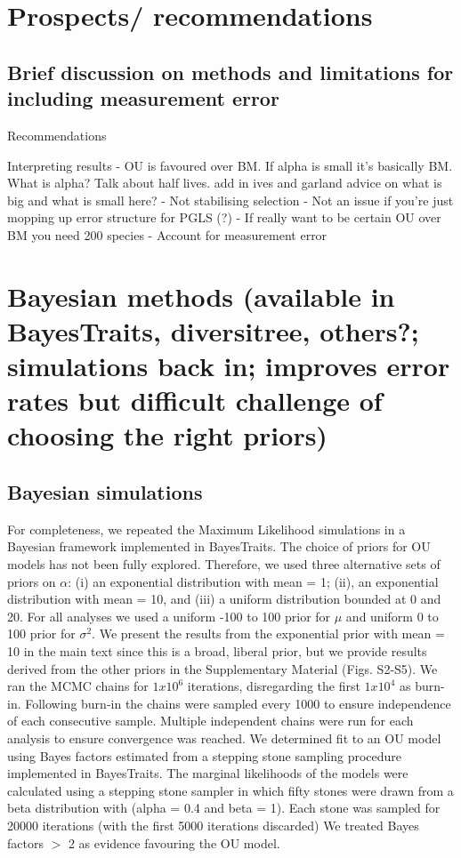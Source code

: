\documentclass[a4paper,12pt]{article}
\begin{document}
\section{Prospects/ recommendations}
  \subsection{Brief discussion on methods and limitations for including measurement error}

  Recommendations

Interpreting results
 - OU is favoured over BM. If alpha is small it's basically BM. What
is alpha? Talk about half lives. add in ives and garland advice on what is big and what is small here?
 - Not stabilising selection
 - Not an issue if you're just mopping up error structure for PGLS (?)
 - If really want to be certain OU over BM you need 200 species
 - Account for measurement error
  
\section{Bayesian methods (available in BayesTraits, diversitree, others?; simulations back in; improves error rates but difficult challenge of choosing the right priors)}

\subsection{Bayesian simulations} %
    For completeness, we repeated the Maximum Likelihood simulations in a Bayesian framework implemented in BayesTraits. 
    The choice of priors for OU models has not been fully explored. 
    Therefore, we used three alternative sets of priors on $\alpha$: (i) an exponential distribution with mean = 1; (ii), an exponential distribution with mean = 10, and (iii) a uniform distribution bounded at 0 and 20. 
    For all analyses we used a uniform -100 to 100 prior for $\mu$ and uniform 0 to 100 prior for $\sigma^2$. 
    We present the results from the exponential prior with mean = 10 in the main text since this is a broad, liberal prior, but we provide results derived from the other priors in the Supplementary Material (Figs. S2-S5). %
    We ran the MCMC chains for $1x10^6$ iterations, disregarding the first $1x10^4$ as burn-in. 
    Following burn-in the chains were sampled every 1000 to ensure independence of each consecutive sample. 
    Multiple independent chains were run for each analysis to ensure convergence was reached. 
    We determined fit to an OU model using Bayes factors estimated from a stepping stone sampling procedure \citep{xie2010improving}implemented in BayesTraits. 
    The marginal likelihoods of the models were calculated using a stepping stone sampler in which fifty stones were drawn from a beta distribution with (alpha = 0.4 and beta = 1). 
    Each stone was sampled for 20000 iterations (with the first 5000 iterations discarded) 
    We treated Bayes factors $>$ 2 as evidence favouring the OU model. 
\end{document}
